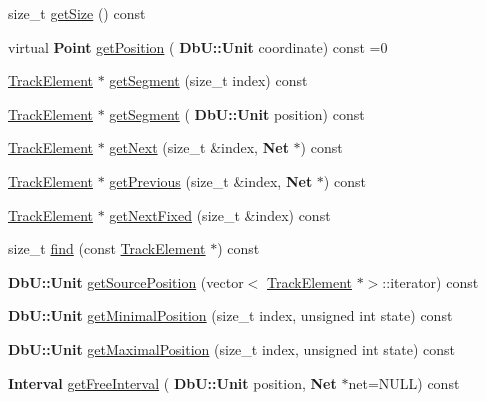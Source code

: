 \begin{DoxyCompactItemize}
\item 
size\+\_\+t \mbox{\hyperlink{classKite_1_1Track_a9be1e4285daa77fe397767c097fbdc66}{get\+Size}} () const
\item 
virtual \textbf{ Point} \mbox{\hyperlink{classKite_1_1Track_a2a033f90e528d3d07aa33694dd733200}{get\+Position}} (\textbf{ Db\+U\+::\+Unit} coordinate) const =0
\item 
\mbox{\hyperlink{classKite_1_1TrackElement}{Track\+Element}} $\ast$ \mbox{\hyperlink{classKite_1_1Track_acb93796a96c9737133fb5d90837ab81d}{get\+Segment}} (size\+\_\+t index) const
\item 
\mbox{\hyperlink{classKite_1_1TrackElement}{Track\+Element}} $\ast$ \mbox{\hyperlink{classKite_1_1Track_a6962a27db7ae946217ea692983fc6a8c}{get\+Segment}} (\textbf{ Db\+U\+::\+Unit} position) const
\item 
\mbox{\hyperlink{classKite_1_1TrackElement}{Track\+Element}} $\ast$ \mbox{\hyperlink{classKite_1_1Track_af3db59591bef3c690ace92c114a4e4aa}{get\+Next}} (size\+\_\+t \&index, \textbf{ Net} $\ast$) const
\item 
\mbox{\hyperlink{classKite_1_1TrackElement}{Track\+Element}} $\ast$ \mbox{\hyperlink{classKite_1_1Track_a290fcfe6131730d216951a3b5207d777}{get\+Previous}} (size\+\_\+t \&index, \textbf{ Net} $\ast$) const
\item 
\mbox{\hyperlink{classKite_1_1TrackElement}{Track\+Element}} $\ast$ \mbox{\hyperlink{classKite_1_1Track_a72e18efeecb4641a1ad2989d80b48fec}{get\+Next\+Fixed}} (size\+\_\+t \&index) const
\item 
size\+\_\+t \mbox{\hyperlink{classKite_1_1Track_a73cdc70609df1c89393542f301746622}{find}} (const \mbox{\hyperlink{classKite_1_1TrackElement}{Track\+Element}} $\ast$) const
\item 
\textbf{ Db\+U\+::\+Unit} \mbox{\hyperlink{classKite_1_1Track_ab26eeaf466b6b5ba863f73abb3fbfa9a}{get\+Source\+Position}} (vector$<$ \mbox{\hyperlink{classKite_1_1TrackElement}{Track\+Element}} $\ast$$>$\+::iterator) const
\item 
\textbf{ Db\+U\+::\+Unit} \mbox{\hyperlink{classKite_1_1Track_a22b708f606d8d95b52e297d7bc2cab55}{get\+Minimal\+Position}} (size\+\_\+t index, unsigned int state) const
\item 
\textbf{ Db\+U\+::\+Unit} \mbox{\hyperlink{classKite_1_1Track_a68124797edd88ebaf3c9aa00d6ee7822}{get\+Maximal\+Position}} (size\+\_\+t index, unsigned int state) const
\item 
\textbf{ Interval} \mbox{\hyperlink{classKite_1_1Track_aa9c09467d45d95b3ac2b58f09c04ff8d}{get\+Free\+Interval}} (\textbf{ Db\+U\+::\+Unit} position, \textbf{ Net} $\ast$net=N\+U\+LL) const
$$
\end{DoxyCompactItemize}
